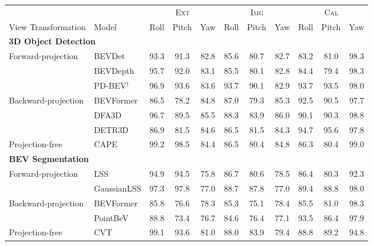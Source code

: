 \begin{table}[t]\centering
\setlength{\tabcolsep}{5pt}
\begin{tabular}{ll ccc ccc ccc}
\toprule
& & \multicolumn{3}{c}{\textsc{Ext}} & \multicolumn{3}{c}{\textsc{Img}} & \multicolumn{3}{c}{\textsc{Cal}}\\
\cmidrule(lr){3-5}\cmidrule(lr){6-8}\cmidrule(lr){9-11}
View Transformation & Model & Roll & Pitch & Yaw & Roll & Pitch & Yaw & Roll & Pitch & Yaw\\
\midrule
\multicolumn{11}{l}{\textbf{3D Object Detection}}\\
\midrule
\multirow{3}{*}{Forward-projection} & BEVDet & 93.3 & 91.3 & 82.8 & 85.6 & 80.7 & 82.7 & 83.2 & 81.0 & 98.3\\
 & BEVDepth & 95.7 & 92.0 & 83.1 & 85.5 & 80.1 & 82.8 & 84.4 & 79.4 & 98.3\\
 & PD-BEV$^\dagger$ & 96.9 & 93.6 & 83.6 & 93.7 & 90.1 & 82.9 & 93.7 & 93.5 & 98.0\\
\midrule
\multirow{3}{*}{Backward-projection} & BEVFormer & 86.5 & 78.2 & 84.8 & 87.0 & 79.3 & 85.3 & 92.5 & 90.5 & 97.7\\
 & DFA3D & 96.7 & 89.5 & 85.5 & 88.3 & 83.9 & 86.0 & 90.1 & 90.3 & 98.8\\
 & DETR3D & 86.9 & 81.5 & 84.6 & 86.5 & 81.5 & 84.3 & 94.7 & 95.6 & 97.8\\
\midrule
Projection-free & CAPE & 99.2 & 98.5 & 84.4 & 86.5 & 80.4 & 84.8 & 86.3 & 80.4 & 99.0\\
\midrule
\multicolumn{11}{l}{\textbf{BEV Segmentation}}\\
\midrule
\multirow{2}{*}{Forward-projection} & LSS & 94.9 & 94.5 & 75.8 & 86.7 & 80.6 & 78.5 & 86.4 & 80.3 & 92.3\\
 & GaussianLSS & 97.3 & 97.8 & 77.0 & 88.7 & 87.8 & 77.0 & 89.4 & 88.8 & 98.0\\
\midrule
\multirow{2}{*}{Backward-projection} & BEVFormer & 85.8 & 76.6 & 78.3 & 85.3 & 75.1 & 78.4 & 85.5 & 81.0 & 98.3\\
 & PointBeV & 88.8 & 73.4 & 76.7 & 84.6 & 76.4 & 77.1 & 93.5 & 86.4 & 97.9\\
\midrule
\multirow{3}{*}{Projection-free} & CVT & 99.1 & 93.6 & 81.0 & 88.0 & 83.9 & 79.4 & 88.8 & 89.2 & 94.8\\

\end{tabular}
\end{table}
